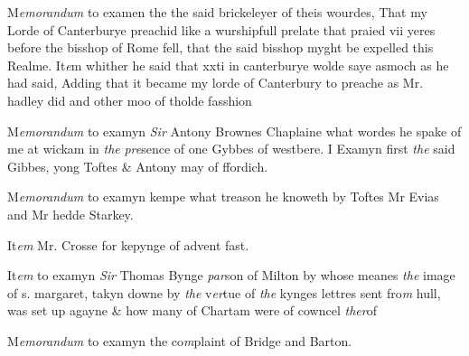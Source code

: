 \documentclass[12pt, a4paper]{book}
\begin{document}
	
		\ifthenelse{\isodd{\thepage}}
		{\reversemarginpar}
		{\normalmarginpar}
		M\textit{emorandum} to examen the the said brickeleyer of theis wourdes, That my
		Lorde of Canterburye preachid like a wurshipfull prelate
 that praied vii yeres before the bisshop of Rome fell, that
 the said bisshop myght be expelled this Realme.
		It\textit{e}m whither he said that xxti in canterburye wolde saye asmoch
		as he had said, Adding that it became my lorde of Canterbury
 to preache as Mr. hadley did and other moo of tholde fasshion
 

            

		\ifthenelse{\isodd{\thepage}}
		{\reversemarginpar}
		{\normalmarginpar}
		M\textit{emorandum} to examyn \textit{Sir} Antony Brownes Chaplaine what
 wordes he spake of me at wickam in \textit{the}
               \textit{pre}sence of one
	Gybbes of westbere. I Examyn first \textit{the} said Gibbes, yong
 Toftes \& Antony may of ffordich.

            
            	
				\marginpar[\vspace{0.5cm}{\textcolor{Gray}{n}}]{}
			
		\ifthenelse{\isodd{\thepage}}
		{\reversemarginpar}
		{\normalmarginpar}
		M\textit{emorandum} to examyn kempe what treason he knoweth by Toftes
            		Mr Evias and Mr hedde Starkey.
            	
		\ifthenelse{\isodd{\thepage}}
		{\reversemarginpar}
		{\normalmarginpar}
		It\textit{em} Mr. Crosse for kepynge of advent fast.
            		
		\ifthenelse{\isodd{\thepage}}
		{\reversemarginpar}
		{\normalmarginpar}
		It\textit{em} to examyn \textit{Sir} Thomas Bynge \textit{par}son of Milton by
 whose meanes \textit{the} image of s. margaret, takyn downe
 by \textit{the} v\textit{er}tue of \textit{the} kynges lettres sent fro\textit{m} hull, was set
 up agayne \& how many of Chartam were of cowncel \textit{ther}of
 

            
            	
		\ifthenelse{\isodd{\thepage}}
		{\reversemarginpar}
		{\normalmarginpar}
		M\textit{emorandum} to examyn the co\textit{m}plaint of Bridge and Barton.
\end{document}
